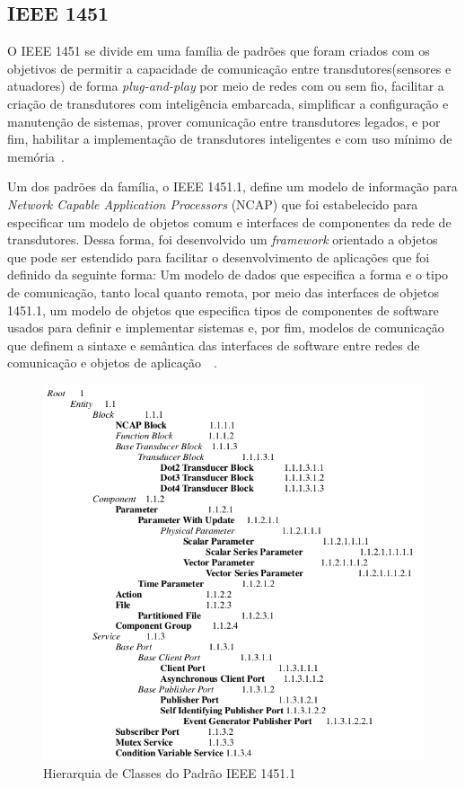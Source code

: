 \subsection{IEEE 1451}
O IEEE 1451 se divide em uma família de padrões que foram criados com os objetivos de permitir a capacidade de comunicação entre transdutores(sensores e atuadores) de forma \emph{plug-and-play} por meio de redes com ou sem fio, facilitar a criação de transdutores com inteligência embarcada, simplificar a configuração e manutenção de sistemas, prover comunicação entre transdutores legados, e por fim, habilitar a implementação de transdutores inteligentes e com uso mínimo de memória~\cite{ieee1451journal}.

Um dos padrões da família, o IEEE 1451.1, define um modelo de informação para \emph{Network Capable Application Processors} (NCAP) que foi estabelecido para especificar um modelo de objetos comum e interfaces de componentes da rede de transdutores. Dessa forma, foi desenvolvido um \emph{framework} orientado a objetos que pode ser estendido para facilitar o desenvolvimento de aplicações que foi definido da seguinte forma: Um modelo de dados que especifica a forma e o tipo de comunicação, tanto local quanto remota, por meio das interfaces de objetos 1451.1, um modelo de objetos que especifica tipos de componentes de software usados para definir e implementar sistemas e, por fim, modelos de comunicação que definem a sintaxe e semântica das interfaces de software entre redes de comunicação e objetos de aplicação~\cite{ieeeOO1451}~\cite{ieee1451monitoring}.

\begin{figure}[ht]
\center
\includegraphics[scale=0.5]{imagens/ieee1451-classHierarchy}
\caption{Hierarquia de Classes do Padrão IEEE 1451.1}
\label{fig:classHierarchy}
\end{figure}


